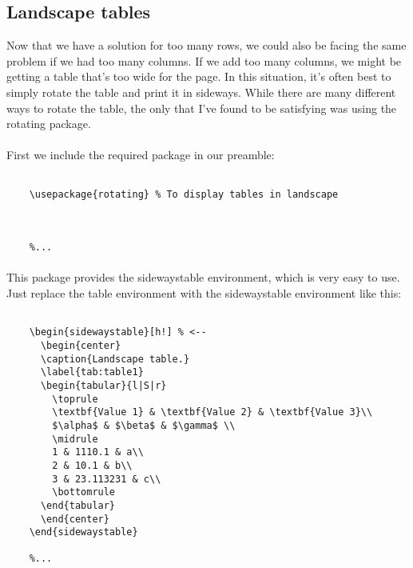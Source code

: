   \subsection{Landscape tables}
  Now that we have a solution for too many rows, we could also be facing the same problem if we had too many columns. If we add too many columns, we might be getting a table that's too wide for the page. In this situation, it's often best to simply rotate the table and print it in sideways. While there are many different ways to rotate the table, the only that I've found to be satisfying was using the rotating package.
  \paragraph{}
  First we include the required package in our preamble:
  \begin{lstlisting}[language={[LaTeX]TeX},breaklines=true,frame=single]
    %...

    \usepackage{rotating} % To display tables in landscape
    
     
    
    %...
  \end{lstlisting}
  \paragraph{}
  This package provides the sidewaystable environment, which is very easy to use. Just replace the table environment with the sidewaystable environment like this:
  \begin{lstlisting}[language={[LaTeX]TeX},breaklines=true,frame=single]
    %...

    \begin{sidewaystable}[h!] % <--
      \begin{center}
      \caption{Landscape table.}
      \label{tab:table1}
      \begin{tabular}{l|S|r}
        \toprule
        \textbf{Value 1} & \textbf{Value 2} & \textbf{Value 3}\\
        $\alpha$ & $\beta$ & $\gamma$ \\
        \midrule
        1 & 1110.1 & a\\
        2 & 10.1 & b\\
        3 & 23.113231 & c\\
        \bottomrule
      \end{tabular}
      \end{center}
    \end{sidewaystable}
    
    %...
  \end{lstlisting}
